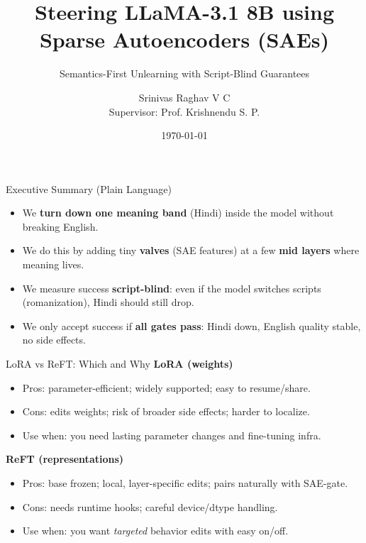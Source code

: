 \documentclass[aspectratio=169]{beamer}
\title{Steering LLaMA-3.1 8B using Sparse Autoencoders (SAEs)}
\subtitle{Semantics-First Unlearning with Script-Blind Guarantees}
\author{Srinivas Raghav V C \\ \small Supervisor: Prof. Krishnendu S. P.}
\institute{Your Institution}
\date{\today}
\begin{document}
{
\maketitle
}

\begin{frame}{Executive Summary (Plain Language)}
\large
\begin{itemize}
  \item We \textbf{turn down one meaning band} (Hindi) inside the model without breaking English.
  \item We do this by adding tiny \textbf{valves} (SAE features) at a few \textbf{mid layers} where meaning lives.
  \item We measure success \textbf{script-blind}: even if the model switches scripts (romanization), Hindi should still drop.
  \item We only accept success if \textbf{all gates pass}: Hindi down, English quality stable, no side effects.
\end{itemize}
\end{frame}

\begin{frame}{LoRA vs ReFT: Which and Why}
\small
\textbf{LoRA (weights)}
\begin{itemize}
  \item Pros: parameter-efficient; widely supported; easy to resume/share.
  \item Cons: edits weights; risk of broader side effects; harder to localize.
  \item Use when: you need lasting parameter changes and fine-tuning infra.
\end{itemize}
\vspace{1mm}
\textbf{ReFT (representations)}
\begin{itemize}
  \item Pros: base frozen; local, layer-specific edits; pairs naturally with SAE-gate.
  \item Cons: needs runtime hooks; careful device/dtype handling.
  \item Use when: you want \emph{targeted} behavior edits with easy on/off.
\end{itemize}
\end{frame}
\end{document}
